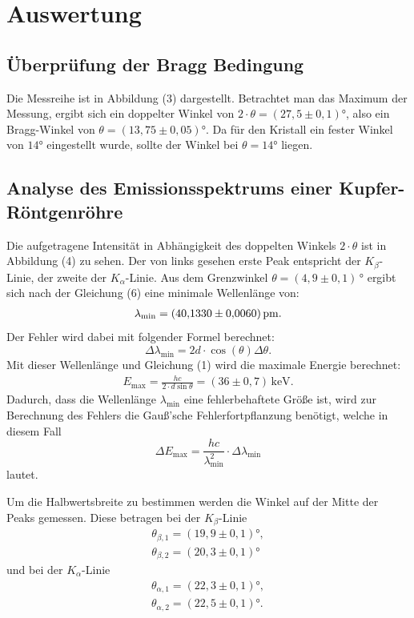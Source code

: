 \section{Auswertung}
\label{sec:Auswertung}

\subsection{Überprüfung der Bragg Bedingung}
Die Messreihe ist in Abbildung (3) dargestellt.
Betrachtet man das Maximum der Messung, ergibt sich ein doppelter Winkel von $2 \cdot \theta = (27,5 \pm 0,1)$°, also ein Bragg-Winkel von $\theta = (13,75 \pm 0,05)$°. Da für den Kristall ein fester Winkel von $14$° eingestellt wurde, sollte der Winkel bei $\theta = 14$° liegen.


\subsection{Analyse des Emissionsspektrums einer Kupfer-Röntgenröhre}
Die aufgetragene Intensität in Abhängigkeit des doppelten Winkels $2 \cdot \theta$ ist in Abbildung (4) zu sehen.
Der von links gesehen erste Peak entspricht der $K_{\beta}$-Linie, der zweite der $K_{\alpha}$-Linie.
Aus dem Grenzwinkel $\theta = (4,9 \pm 0,1)\,$° ergibt sich nach der Gleichung (6) eine minimale Wellenlänge von:
\begin{align*}
\lambda_\text{min} = (\num{40,133 +- 0,0060})\,\si{\pico\meter}.
\end{align*}
Der Fehler wird dabei mit folgender Formel berechnet:
\begin{equation}
  \label{eqn:fehlerlambda}
  \Delta \lambda_\text{min} = 2d \cdot \cos{\left (\theta \right )} \Delta\theta.
\end{equation}
Mit dieser Wellenlänge und Gleichung (1) wird die maximale Energie berechnet:
\begin{align*}
E_\text{max} = \frac{hc}{2\cdot d \sin{\theta}} = (36 \pm 0,7)\,\si{\keV}.
\end{align*}
Dadurch, dass die Wellenlänge $\lambda_\text{min}$ eine fehlerbehaftete Größe ist, wird zur Berechnung des Fehlers die Gauß'sche Fehlerfortpflanzung benötigt,
welche in diesem Fall 
\begin{equation}
  \label{eqn:fehlerenergie}
\Delta E_\text{max} = \frac{hc}{\lambda_\text{min}^2} \cdot \Delta \lambda_\text{min}
\end{equation}
lautet.


\noindent Um die Halbwertsbreite zu bestimmen werden die Winkel auf der Mitte der Peaks gemessen. 
Diese betragen bei der $K_{\beta}$-Linie
\begin{align*}
\theta_{\beta,1} = (19,9 \pm 0,1) °, \\
\theta_{\beta,2} = (20,3 \pm 0,1) °
\end{align*}
und bei der $K_{\alpha}$-Linie
\begin{align*}
\theta_{\alpha,1} = (22,3 \pm 0,1) °, \\
\theta_{\alpha,2} = (22,5 \pm 0,1) °.
\end{align*}

